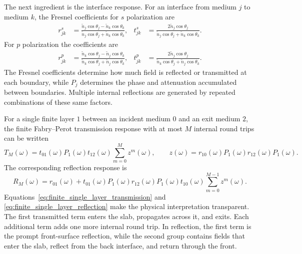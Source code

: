 \documentclass[11pt]{article}
\newcommand{\nt}{\tilde{n}}
\begin{document}
The next ingredient is the interface response. For an interface from medium \(j\) to medium \(k\), the Fresnel coefficients for \(s\) polarization are
\begin{align}
  r_{jk}^{s}
  &=
  \frac{\nt_j\cos\theta_j-\nt_k\cos\theta_k}
       {\nt_j\cos\theta_j+\nt_k\cos\theta_k},
  &
  t_{jk}^{s}
  &=
  \frac{2\nt_j\cos\theta_j}
       {\nt_j\cos\theta_j+\nt_k\cos\theta_k}.
  \label{eq:fresnel_s}
\end{align}
For \(p\) polarization the coefficients are
\begin{align}
  r_{jk}^{p}
  &=
  \frac{\nt_k\cos\theta_j-\nt_j\cos\theta_k}
       {\nt_k\cos\theta_j+\nt_j\cos\theta_k},
  &
  t_{jk}^{p}
  &=
  \frac{2\nt_j\cos\theta_j}
       {\nt_k\cos\theta_j+\nt_j\cos\theta_k}.
  \label{eq:fresnel_p}
\end{align}
The Fresnel coefficients determine how much field is reflected or transmitted at each boundary, while \(P_j\) determines the phase and attenuation accumulated between boundaries. Multiple internal reflections are generated by repeated combinations of these same factors.

For a single finite layer \(1\) between an incident medium \(0\) and an exit medium \(2\), the finite Fabry--Perot transmission response with at most \(M\) internal round trips can be written
\begin{equation}
  T_M(\omega)
  =
  t_{01}(\omega)P_1(\omega)t_{12}(\omega)
  \sum_{m=0}^{M}
  z^m(\omega),
  \qquad
  z(\omega)=r_{10}(\omega)P_1(\omega)r_{12}(\omega)P_1(\omega).
  \label{eq:finite_single_layer_transmission}
\end{equation}
The corresponding reflection response is
\begin{equation}
  R_M(\omega)
  =
  r_{01}(\omega)
  +
  t_{01}(\omega)P_1(\omega)r_{12}(\omega)P_1(\omega)t_{10}(\omega)
  \sum_{m=0}^{M-1}z^m(\omega).
  \label{eq:finite_single_layer_reflection}
\end{equation}
Equations~\eqref{eq:finite_single_layer_transmission} and \eqref{eq:finite_single_layer_reflection} make the physical interpretation transparent. The first transmitted term enters the slab, propagates across it, and exits. Each additional term adds one more internal round trip. In reflection, the first term is the prompt front-surface reflection, while the second group contains fields that enter the slab, reflect from the back interface, and return through the front.
\end{document}
